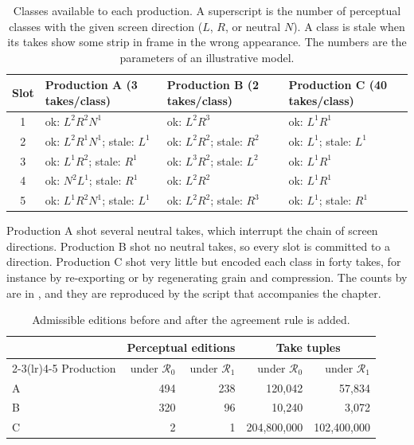 \documentclass[11pt,twoside,openright]{book}
\theoremstyle{plain}
\theoremstyle{definition}
\theoremstyle{remark}
\begin{document}
\begin{table}[ht]
\centering
\small
\begin{tabular}{@{}c l l l@{}}
\toprule
Slot & Production A (3 takes/class) & Production B (2 takes/class) & Production C (40 takes/class)\\
\midrule
1 & ok: $L^2R^2N^1$ & ok: $L^2R^3$ & ok: $L^1R^1$\\
2 & ok: $L^2R^1N^1$; stale: $L^1$ & ok: $L^2R^2$; stale: $R^2$ & ok: $L^1$; stale: $L^1$\\
3 & ok: $L^1R^2$; stale: $R^1$ & ok: $L^3R^2$; stale: $L^2$ & ok: $L^1R^1$\\
4 & ok: $N^2L^1$; stale: $R^1$ & ok: $L^2R^2$ & ok: $L^1R^1$\\
5 & ok: $L^1R^2N^1$; stale: $L^1$ & ok: $L^2R^2$; stale: $R^3$ & ok: $L^1$; stale: $R^1$\\
\bottomrule
\end{tabular}
\caption{Classes available to each production. A superscript is the number of perceptual classes with the given screen direction ($L$, $R$, or neutral $N$). A class is stale when its takes show some strip in frame in the wrong appearance. The numbers are the parameters of an illustrative model.}\label{tab:pools}
\end{table}

Production A shot several neutral takes, which interrupt the chain of screen directions. Production B shot no neutral takes, so every slot is committed to a direction. Production C shot very little but encoded each class in forty takes, for instance by re-exporting or by regenerating grain and compression. The counts by  are in , and they are reproduced by the script that accompanies the chapter.

\begin{table}[ht]
\centering
\begin{tabular}{@{}lrrrr@{}}
\toprule
 & \multicolumn{2}{c}{Perceptual editions} & \multicolumn{2}{c}{Take tuples}\\
\cmidrule(lr){2-3}\cmidrule(lr){4-5}
Production & under $\mathcal R_0$ & under $\mathcal R_1$ & under $\mathcal R_0$ & under $\mathcal R_1$\\
\midrule
A & 494 & 238 & 120,042 & 57,834\\
B & 320 & 96 & 10,240 & 3,072\\
C & 2 & 1 & 204,800,000 & 102,400,000\\
\bottomrule
\end{tabular}
\caption{Admissible editions before and after the agreement rule is added.}\label{tab:counts}
\end{table}
\end{document}
